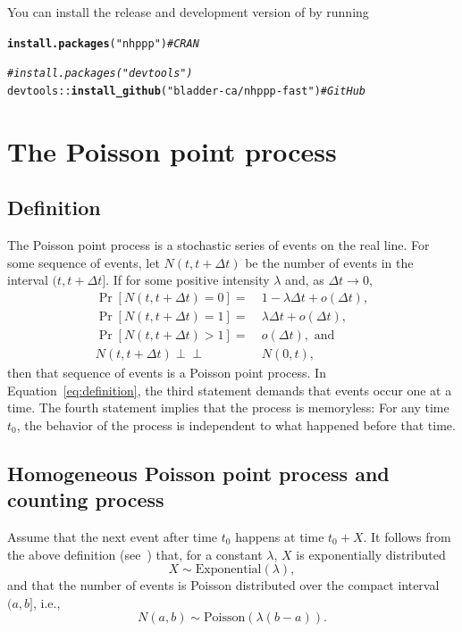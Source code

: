 \documentclass[article,nojss]{jss}\usepackage[]{graphicx}\usepackage[]{xcolor}
\makeatletter
\newcommand{\hlstr}[1]{\textcolor[rgb]{0.192,0.494,0.8}{#1}}%
\newcommand{\hlcom}[1]{\textcolor[rgb]{0.678,0.584,0.686}{\textit{#1}}}%
\newcommand{\hlopt}[1]{\textcolor[rgb]{0,0,0}{#1}}%
\newcommand{\hlstd}[1]{\textcolor[rgb]{0.345,0.345,0.345}{#1}}%
\newcommand{\hlkwd}[1]{\textcolor[rgb]{0.737,0.353,0.396}{\textbf{#1}}}%
\newenvironment{kframe}{%
 \def\at@end@of@kframe{}%
 \ifinner\ifhmode%
  \def\at@end@of@kframe{\end{minipage}}%
  \begin{minipage}{\columnwidth}%
 \fi\fi%
 \def\FrameCommand##1{\hskip\@totalleftmargin \hskip-\fboxsep
 \colorbox{shadecolor}{##1}\hskip-\fboxsep
     \hskip-\linewidth \hskip-\@totalleftmargin \hskip\columnwidth}%
 \MakeFramed {\advance\hsize-\width
   \@totalleftmargin\z@ \linewidth\hsize
   \@setminipage}}%
 {\par\unskip\endMakeFramed%
 \at@end@of@kframe}
\newenvironment{knitrout}{}{} %
\newcommand{\indep}{\perp \!\!\! \perp}
\makeatother
\begin{document}
You can install the release and development version of  by running
\begin{knitrout}
\color{fgcolor}\begin{kframe}
\begin{alltt}
\hlkwd{install.packages}\hlstd{(}\hlstr{"nhppp"}\hlstd{)} \hlcom{# CRAN}

\hlcom{# install.packages("devtools")}
\hlstd{devtools}\hlopt{::}\hlkwd{install_github}\hlstd{(}\hlstr{"bladder-ca/nhppp-fast"}\hlstd{)} \hlcom{# GitHub}
\end{alltt}
\end{kframe}
\end{knitrout}

\section{The Poisson point process} \label{sec:review}
\subsection{Definition}
The Poisson point process is a stochastic series of events on the real line. For some sequence of events, let $N(t, t + \Delta t)$ be the number of events in the interval $(t, t  + \Delta t]$. If for some positive intensity $\lambda$ and, as ${\Delta t \rightarrow 0}$,
\begin{equation}\label{eq:definition}
    \begin{aligned}
    \Pr[N(t, t + \Delta t) = 0] =&\  1 - \lambda \Delta t +  o(\Delta t), \\
    \Pr[N(t, t + \Delta t) = 1] =&\  \lambda \Delta t +  o(\Delta t), \\
    \Pr[N(t, t + \Delta t) >1] =&\  o(\Delta t),\text{ and } \\
    N(t, t + \Delta t) \indep&\ N(0, t),
    \end{aligned}
\end{equation}
then that sequence of events is a Poisson point process. In Equation~\eqref{eq:definition}, the third statement demands that events occur one at a time. The fourth statement implies that the process is memoryless: For any time $t_0$, the behavior of the process is independent to what happened before that time.

\subsection{Homogeneous Poisson point process and counting process}\label{sec:ppp-intro}
Assume that the next event after time $t_0$ happens at time $t_0 + X$. It follows from the above definition (see~\citet[par. 4.1]{cox1965theory}) that, for a constant $\lambda$, $X$ is exponentially distributed
\begin{equation}\label{eq:X_PPP}
X \sim \text{Exponential}(\lambda),
\end{equation}
and that the number of events is Poisson distributed over the compact interval $(a, b]$, i.e.,
\begin{equation}\label{eq:N_PPP}
N(a, b) \sim \text{Poisson}(\lambda (b-a)).
\end{equation}
\end{document}
